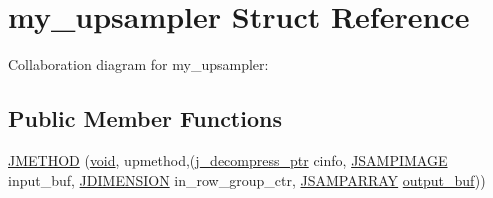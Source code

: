 \hypertarget{structmy__upsampler}{}\section{my\+\_\+upsampler Struct Reference}
\label{structmy__upsampler}


Collaboration diagram for my\+\_\+upsampler\+:
\subsection*{Public Member Functions}
\begin{DoxyCompactItemize}
\item 
\hyperlink{structmy__upsampler_a6d4b85127ea561ce45e42fbff490d5d1}{J\+M\+E\+T\+H\+O\+D} (\hyperlink{png_8h_aa8c59027f9ab2769342f248709d68d17}{void}, upmethod,(\hyperlink{jpeglib_8h_a00c7d78af44bd26a901c791ccfc1e178}{j\+\_\+decompress\+\_\+ptr} cinfo, \hyperlink{jpeglib_8h_a4bf858e4d42202287e786bdec2f3b62b}{J\+S\+A\+M\+P\+I\+M\+A\+G\+E} input\+\_\+buf, \hyperlink{jmorecfg_8h_a04ed4674f6f1d0d50ec241531e38274f}{J\+D\+I\+M\+E\+N\+S\+I\+O\+N} in\+\_\+row\+\_\+group\+\_\+ctr, \hyperlink{jpeglib_8h_ac9d5d1b829ed51769db69a37271a7e91}{J\+S\+A\+M\+P\+A\+R\+R\+A\+Y} \hyperlink{jdct_8h_ad7e4660a191b1a791748dd44d5a7a0ec}{output\+\_\+buf}))
\end{DoxyCompactItemize}
